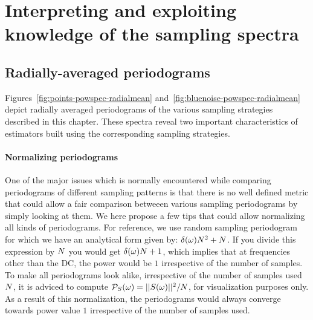 \documentclass[11pt,fleqn]{book} %
\begin{document}
%
%
%



%

%

\section{Interpreting and exploiting knowledge of the sampling spectra}

\subsection{Radially-averaged periodograms}
Figures~\ref{fig:points-powspec-radialmean} and~\ref{fig:bluenoise-powspec-radialmean} depict radially averaged periodograms of the various sampling strategies described in this chapter. These spectra reveal two important characteristics of estimators built using the corresponding sampling strategies. 

\paragraph{Normalizing periodograms} 
One of the major issues which is normally encountered while comparing periodograms of different sampling patterns is that there is no well defined metric that could allow a fair comparison betweeen various sampling periodograms by simply looking at them. We here propose a few tips that could allow normalizing all kinds of periodograms. For reference, we use random sampling periodogram for which we have an analytical form given by: $\delta(\omega) N^2 + N$. 
%
%
If you divide this expression by $N$ you would get $\delta(\omega) N + 1$, which implies that at frequencies other than the DC, the power would be $1$ irrespective of the number of samples. 
To make all periodograms look alike, irrespective of the number of samples used $N$, it is adviced to compute $\mathcal{P}_{S}(\mathbf{\omega}) = ||S(\mathbf{\omega})||^2 / N$, for visualization  purposes only. As a result of this normalization, the periodograms would always converge towards power value $1$ irrespective of the number of samples used.
\end{document}
